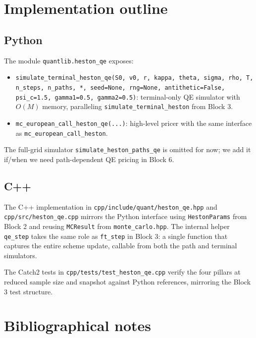\documentclass[11pt]{article}
\theoremstyle{plain}
\theoremstyle{definition}
\theoremstyle{remark}
\begin{document}
\section{Implementation outline}

\subsection{Python}

The module \texttt{quantlib.heston\_qe} exposes:

\begin{itemize}[topsep=2pt]
    \item \texttt{simulate\_terminal\_heston\_qe(S0, v0, r, kappa, theta, sigma, rho, T, n\_steps, n\_paths, *, seed=None, rng=None, antithetic=False, psi\_c=1.5, gamma1=0.5, gamma2=0.5)}: terminal-only QE simulator with $O(M)$ memory, paralleling \texttt{simulate\_terminal\_heston} from Block 3.
    \item \texttt{mc\_european\_call\_heston\_qe(...)}: high-level pricer with the same interface as \texttt{mc\_european\_call\_heston}.
\end{itemize}
The full-grid simulator \texttt{simulate\_heston\_paths\_qe} is omitted for now; we add it if/when we need path-dependent QE pricing in Block 6.

\subsection{C++}

The C++ implementation in \texttt{cpp/include/quant/heston\_qe.hpp} and \texttt{cpp/src/heston\_qe.cpp} mirrors the Python interface using \texttt{HestonParams} from Block 2 and reusing \texttt{MCResult} from \texttt{monte\_carlo.hpp}. The internal helper \texttt{qe\_step} takes the same role as \texttt{ft\_step} in Block 3: a single function that captures the entire scheme update, callable from both the path and terminal simulators.

The Catch2 tests in \texttt{cpp/tests/test\_heston\_qe.cpp} verify the four pillars at reduced sample size and snapshot against Python references, mirroring the Block 3 test structure.

\section{Bibliographical notes}
\end{document}
